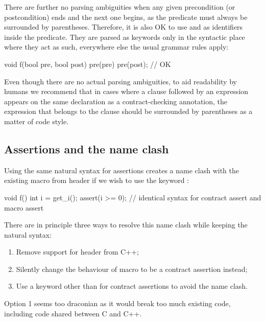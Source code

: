 There are further no parsing ambiguities when any given precondition (or postcondition) ends and the next one begins, as the predicate must always be surrounded by parentheses. Therefore, it is also OK to use  and  as identifiers inside the predicate. They are parsed as keywords only in the syntactic place where they act as such, everywhere else the usual grammar rules apply:

\begin{codeblock}
void f(bool pre, bool post)
  pre(pre) pre(post);   // OK
\end{codeblock}

Even though there are no actual parsing ambiguities, to aid readability by humans we recommend  that in cases where a  clause  followed by an expression appears on the same declaration as a contract-checking annotation, the expression that belongs to the  clause should be surrounded by parentheses as a matter of code style.

\subsection{Assertions and the  name clash}
\label{subsec:assrt}

Using the same natural syntax for assertions creates a name clash with the existing  macro from header  if we wish to use the keyword :

\begin{codeblock}
void f() {
  int i = get_i();
  assert(i >= 0);  // identical syntax for contract assert and macro assert
}
\end{codeblock}

There are in principle three ways to resolve this name clash while keeping the natural syntax:

\begin{enumerate}
\item Remove support for header  from C++;
\item Silently change the behaviour of macro  to be a contract assertion instead;
\item Use a keyword other than  for contract assertions to avoid the name clash.
\end{enumerate}

Option 1 seems too draconian as it would break too much existing code, including code shared between C and C++.

